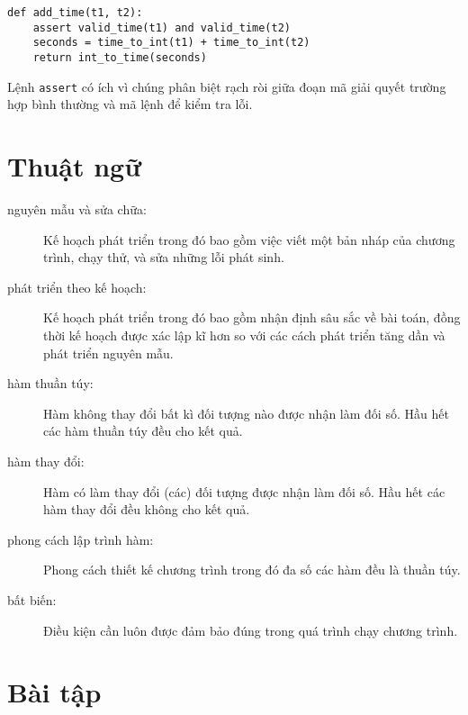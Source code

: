 \documentclass[11pt]{book}
\begin{document}

\beforeverb
\begin{verbatim}
def add_time(t1, t2):
    assert valid_time(t1) and valid_time(t2)
    seconds = time_to_int(t1) + time_to_int(t2)
    return int_to_time(seconds)
\end{verbatim}
\afterverb
%
Lệnh {\tt assert} có ích vì chúng phân biệt rạch ròi giữa đoạn mã
giải quyết trường hợp bình thường và mã lệnh để kiểm tra lỗi.


\section{Thuật ngữ}

\begin{description}

\item[nguyên mẫu và sửa chữa:] Kế hoạch phát triển trong đó bao gồm
việc viết một bản nháp của chương trình, chạy thử, và sửa những lỗi
phát sinh.

\item[phát triển theo kế hoạch:] Kế hoạch phát triển trong đó bao gồm
nhận định sâu sắc về bài toán, đồng thời kế hoạch được xác lập kĩ hơn
so với các cách phát triển tăng dần và phát triển nguyên mẫu.

\item[hàm thuần túy:] Hàm không thay đổi bất kì đối tượng nào được nhận
làm đối số. Hầu hết các hàm thuần túy đều cho kết quả.

\item[hàm thay đổi:] Hàm có làm thay đổi (các) đối tượng được nhận làm
đối số. Hầu hết các hàm thay đổi đều không cho kết quả.

\item[phong cách lập trình hàm:] Phong cách thiết kế chương trình trong đó
đa số các hàm đều là thuần túy.

\item[bất biến:] Điều kiện cần luôn được đảm bảo đúng trong quá trình
chạy chương trình.

\end{description}


\section{Bài tập}
\end{document}
